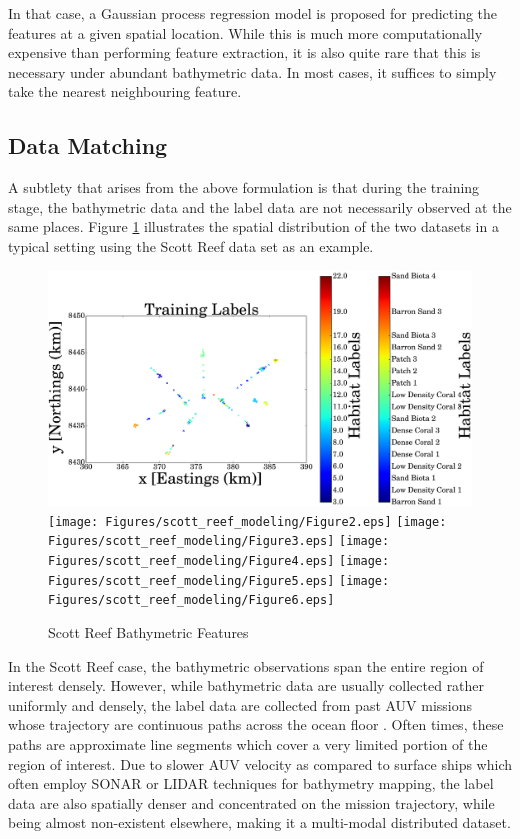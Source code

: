 		In that case, a Gaussian process regression model is proposed for predicting the features at a given spatial location. While this is much more computationally expensive than performing feature extraction, it is also quite rare that this is necessary under abundant bathymetric data. In most cases, it suffices to simply take the nearest neighbouring feature.
		
		\FloatBarrier
		
		\subsection{Data Matching}
		\label{BenthicHabitatMapping:BathymetricFeatures:DataMatching}
		
			A subtlety that arises from the above formulation is that during the training stage, the bathymetric data and the label data are not necessarily observed at the same places. Figure \ref{Figure:ScottReefBathymetricFeatures} illustrates the spatial distribution of the two datasets in a typical setting using the Scott Reef data set \citep{IMOS} as an example.
		
			\begin{figure}[!htbp]
			\centering
				\includegraphics[width = 0.32\linewidth]{Figures/scott_reef_modeling/Figure1.eps}
				\texttt{[image: Figures/scott\_reef\_modeling/Figure2.eps]}
				\texttt{[image: Figures/scott\_reef\_modeling/Figure3.eps]}
				\texttt{[image: Figures/scott\_reef\_modeling/Figure4.eps]}
				\texttt{[image: Figures/scott\_reef\_modeling/Figure5.eps]}
				\texttt{[image: Figures/scott\_reef\_modeling/Figure6.eps]}
			\caption{Scott Reef Bathymetric Features}
			\label{Figure:ScottReefBathymetricFeatures}
			\end{figure}
			
			In the Scott Reef case, the bathymetric observations span the entire region of interest densely. However, while bathymetric data are usually collected rather uniformly and densely, the label data are collected from past AUV missions whose trajectory are continuous paths across the ocean floor \citep{Squidle}. Often times, these paths are approximate line segments which cover a very limited portion of the region of interest. Due to slower AUV velocity as compared to surface ships which often employ SONAR or LIDAR techniques for bathymetry mapping, the label data are also spatially denser and concentrated on the mission trajectory, while being almost non-existent elsewhere, making it a multi-modal distributed dataset. 
			
